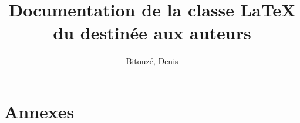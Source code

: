 \documentclass[french,nolocaltoc]{nwejmart}
\newtheorem[title=Fait,style=definition]{fact}
\begin{document}
\title[Documentation de la classe \LaTeX{} du \texorpdfstring{\nwejm}{NWEJM}]{Documentation de la classe \LaTeX{} du \nwejm*{} destinée aux auteurs}
%
\author[%
affiliation={%
  Université du Littoral Côte d'Opale, Laboratoire de mathématiques pures et
  appliquées (\nolinkurl{denis.bitouze@lmpa.univ-littoral.fr})%
},%
]{Bitouzé, Denis}
%
\maketitle
%
\etocarticlestylenomarks
\localtableofcontents
%


%
\section{Annexes}


%
\printbibliography
%
%
\printindex
\end{document}
